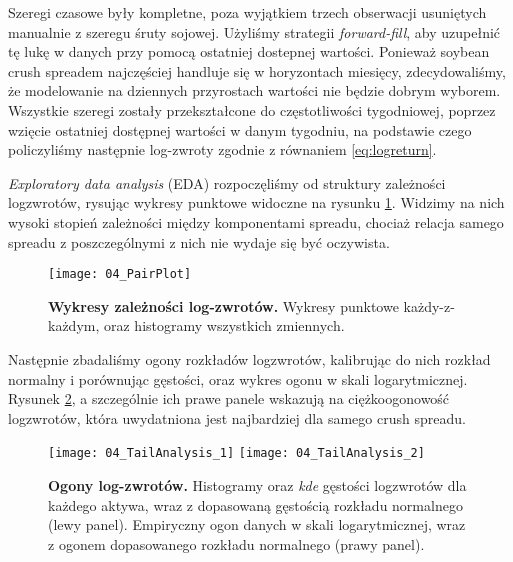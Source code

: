 Szeregi czasowe były kompletne, poza wyjątkiem trzech obserwacji usuniętych manualnie z szeregu śruty sojowej. Użyliśmy strategii \emph{forward-fill}, aby uzupełnić tę lukę w danych przy pomocą ostatniej dostepnej wartości. Ponieważ soybean crush spreadem najczęściej handluje się w horyzontach miesięcy, zdecydowaliśmy, że modelowanie na dziennych przyrostach wartości nie będzie dobrym wyborem. Wszystkie szeregi zostały przekształcone do częstotliwości tygodniowej, poprzez wzięcie ostatniej dostępnej wartości w danym tygodniu, na podstawie czego policzyliśmy następnie log-zwroty zgodnie z równaniem \ref{eq:logreturn}.

\emph{Exploratory data analysis} (EDA) rozpoczęliśmy od struktury zależności logzwrotów, rysując wykresy punktowe widoczne na rysunku \ref{fig:pairplot_original_scale}. Widzimy na nich wysoki stopień zależności między komponentami spreadu, chociaż relacja samego spreadu z poszczególnymi z nich nie wydaje się być oczywista.

\begin{figure}[h]
	\centering
	\texttt{[image: 04\_PairPlot]}
	\caption{\textbf{Wykresy zależności log-zwrotów.} Wykresy punktowe każdy-z-każdym, oraz histogramy wszystkich zmiennych. \label{fig:pairplot_original_scale}}
\end{figure}

Następnie zbadaliśmy ogony rozkładów logzwrotów, kalibrując do nich rozkład normalny i porównując gęstości, oraz wykres ogonu w skali logarytmicznej. Rysunek \ref{fig:tail_analysis}, a szczególnie ich prawe panele wskazują na ciężkoogonowość logzwrotów, która uwydatniona jest najbardziej dla samego crush spreadu.\\

\begin{figure}[h]
	\centering
	\texttt{[image: 04\_TailAnalysis\_1]}
	\texttt{[image: 04\_TailAnalysis\_2]}
	
	\caption{\textbf{Ogony log-zwrotów.} Histogramy oraz \emph{kde} gęstości logzwrotów dla każdego aktywa, wraz z dopasowaną gęstością rozkładu normalnego (lewy panel). Empiryczny ogon danych w skali logarytmicznej, wraz z ogonem dopasowanego rozkładu normalnego (prawy panel). \label{fig:tail_analysis}}
\end{figure}

\FloatBarrier
